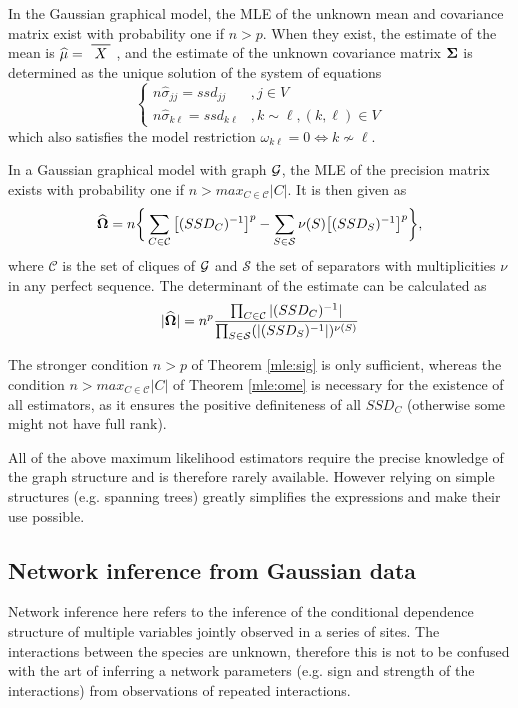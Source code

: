 \begin{theorem}\label{mle:sig}
In the Gaussian graphical model,  the MLE of the unknown mean and covariance matrix exist with probability one if $n>p$. When they exist, the estimate of the mean is $\widehat{\mu} = \xbar{X}$, and the estimate of the unknown covariance matrix ${\boldsymbol{\Sigma}}$ is determined as the unique solution of the system of equations
\begin{equation*}
 \left\{
 \begin{array}{rl}
 n\widehat{\sigma}_{jj} = ssd_{jj}&, j\in V\\
 n\widehat{\sigma}_{k\ell} = ssd_{k\ell}&, k\sim\ell, (k,\ell) \in V
 \end{array} \right.
\end{equation*}  
which also satisfies the model restriction $\omega_{k\ell} =0 \iff k\nsim \ell $.
\end{theorem}

\begin{theorem}\label{mle:ome}
In a Gaussian graphical model with graph $\mathcal{G}$, the MLE of the precision matrix exists with probability one if $n>max_{C\in\mathcal{C}}|C|$. It is then given as
$$\widehat{{\boldsymbol{\Omega}}} = n \bigg\{\sum_{C\in\mathcal{C}} \big[(SSD_C)^{-1}\big]^p-\sum_{S\in\mathcal{S}} \nu(S) \big[(SSD_S)^{-1}\big]^p\bigg\},$$
where $\mathcal{C}$ is the set of cliques of $\mathcal{G}$ and $\mathcal{S}$ the set of separators with multiplicities $\nu$ in any perfect sequence. The determinant of the estimate can be calculated as
$$|\widehat{{\boldsymbol{\Omega}}}| = n^p \dfrac{\prod_{C\in\mathcal{C}}|(SSD_C)^{-1}|}{\prod_{S\in\mathcal{S}} (|(SSD_S)^{-1}|)^{\nu(S)}}$$
\end{theorem}
 
The stronger condition $n>p$ of Theorem \ref{mle:sig} is only sufficient, whereas the condition $n>max_{C\in\mathcal{C}}|C|$ of Theorem \ref{mle:ome} is necessary for the existence of all estimators, as it ensures the positive definiteness of all $SSD_C$ (otherwise some might not have full rank).  

 All of the above maximum likelihood estimators require the precise knowledge of the graph structure and is therefore rarely available. However relying on simple structures (e.g. spanning trees) greatly simplifies the expressions and make their use possible.

\subsection{Network inference from Gaussian data}
\label{infGGM}
  Network inference here refers to the inference of the conditional dependence structure of multiple variables jointly observed in a series of sites. The interactions between the species are unknown, therefore this is not to be confused with the art of inferring a network parameters (e.g. sign and strength of the interactions) from observations of repeated interactions.
  
